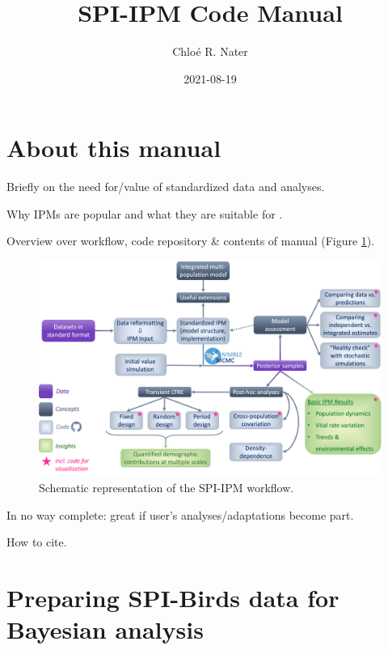\documentclass[
]{book}
\title{SPI-IPM Code Manual}
\author{Chloé R. Nater}
\date{2021-08-19}
\begin{document}
\maketitle

{
\setcounter{tocdepth}{1}
\tableofcontents
}
\hypertarget{about-this-manual}{%
\chapter*{About this manual}\label{about-this-manual}}

Briefly on the need for/value of standardized data and analyses.

Why IPMs are popular and what they are suitable for \citep{kery2011, plard2019}.

Overview over workflow, code repository \& contents of manual (Figure \ref{fig:WorkflowDiag}).

\begin{figure}

{\centering \includegraphics[width=1\linewidth]{Figures/SPI-IPM_Workflow} 

}

\caption{Schematic representation of the SPI-IPM workflow.}\label{fig:WorkflowDiag}
\end{figure}

In no way complete: great if user's analyses/adaptations become part.

How to cite.

\hypertarget{DataPrep}{%
\chapter{Preparing SPI-Birds data for Bayesian analysis}\label{DataPrep}}
\end{document}

